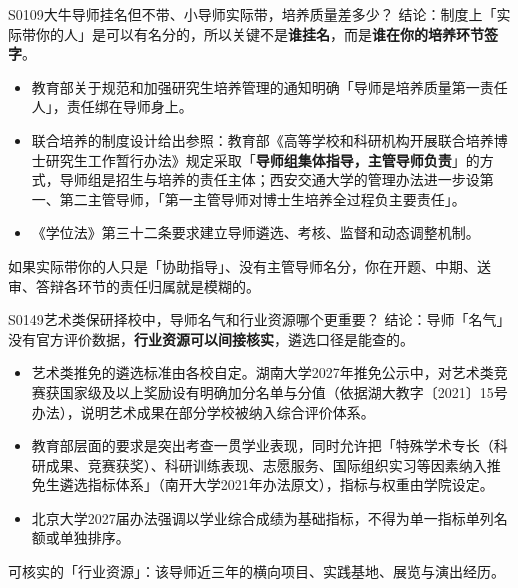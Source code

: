 \begin{qa}{S0109}{大牛导师挂名但不带、小导师实际带，培养质量差多少？}
结论：制度上「实际带你的人」是可以有名分的，所以关键不是\textbf{谁挂名}，而是\textbf{谁在你的培养环节签字}。

\begin{itemize}
  \item 教育部关于规范和加强研究生培养管理的通知明确「导师是培养质量第一责任人」，责任绑在导师身上。
  \item 联合培养的制度设计给出参照：教育部《高等学校和科研机构开展联合培养博士研究生工作暂行办法》规定采取「\textbf{导师组集体指导，主管导师负责}」的方式，导师组是招生与培养的责任主体；西安交通大学的管理办法进一步设第一、第二主管导师，「第一主管导师对博士生培养全过程负主要责任」。
  \item 《学位法》第三十二条要求建立导师遴选、考核、监督和动态调整机制。
\end{itemize}

如果实际带你的人只是「协助指导」、没有主管导师名分，你在开题、中期、送审、答辩各环节的责任归属就是模糊的。
\end{qa}

\begin{qa}{S0149}{艺术类保研择校中，导师名气和行业资源哪个更重要？}
结论：导师「名气」没有官方评价数据，\textbf{行业资源可以间接核实}，遴选口径是能查的。

\begin{itemize}
  \item 艺术类推免的遴选标准由各校自定。湖南大学2027年推免公示中，对艺术类竞赛获国家级及以上奖励设有明确加分名单与分值（依据湖大教字〔2021〕15号办法），说明艺术成果在部分学校被纳入综合评价体系。
  \item 教育部层面的要求是突出考查一贯学业表现，同时允许把「特殊学术专长（科研成果、竞赛获奖）、科研训练表现、志愿服务、国际组织实习等因素纳入推免生遴选指标体系」（南开大学2021年办法原文），指标与权重由学院设定。
  \item 北京大学2027届办法强调以学业综合成绩为基础指标，不得为单一指标单列名额或单独排序。
\end{itemize}

可核实的「行业资源」：该导师近三年的横向项目、实践基地、展览与演出经历。
\end{qa}

